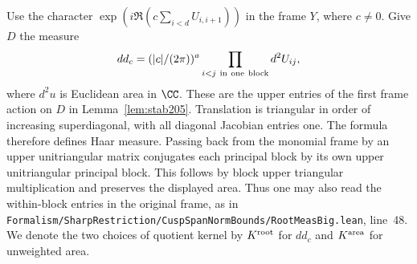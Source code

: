 \documentclass[a4paper,11pt]{article}
\theoremstyle{definition}
\theoremstyle{remark}
\newcommand{\srcloc}[2]{{\small\nolinkurl{#1.lean}}, line~#2}
\numberwithin{equation}{section}
\begin{document}
Use the character \(\exp(i\Re(c\sum_{i<d}U_{i,i+1}))\) in the
frame \(Y\), where \(c\ne0\). Give \(D\) the measure
\[
       dd_c=(|c|/(2\pi))^a\prod_{i<j\ {\rm in\ one\ block}}d^2U_{ij},
\]
where \(d^2u\) is Euclidean area in \(\CC\).
These are the upper entries of the first frame action on \(D\)
in Lemma~\ref{lem:stab205}. Translation is triangular in order
of increasing superdiagonal, with all diagonal Jacobian entries
one. The formula therefore defines Haar measure. Passing back
from the monomial frame by an upper unitriangular matrix conjugates
each principal block by its own upper unitriangular principal
block. This follows by block upper triangular multiplication and
preserves the displayed area. Thus one may also read the within-block
entries in the original frame, as in
\srcloc{Formalism/SharpRestriction/CuspSpanNormBounds/RootMeasBig}{48}.
We denote the two choices of quotient kernel by \(K^{\rm root}\)
for \(dd_c\) and \(K^{\rm area}\) for unweighted area.
\end{document}
